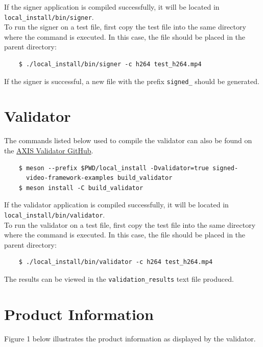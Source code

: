 \documentclass[a4paper,12pt]{article}
\begin{document}
If the signer application is compiled successfully, it will be located in \texttt{local\_install/bin/signer}. \\

To run the signer on a test file, first copy the test file into the same directory where the command is executed. In this case, the file should be placed in the parent directory:

\begin{verbatim}
    $ ./local_install/bin/signer -c h264 test_h264.mp4 
\end{verbatim}

If the signer is successful, a new file with the prefix \texttt{signed\_} should be generated.

\section{Validator}

The commands listed below used to compile the validator can also be found on the \href{https://github.com/AxisCommunications/signed-video-framework-examples/tree/master/apps/validator}{AXIS Validator GitHub}. 

\begin{verbatim}
    $ meson --prefix $PWD/local_install -Dvalidator=true signed-
      video-framework-examples build_validator
    $ meson install -C build_validator
\end{verbatim}

If the validator application is compiled successfully, it will be located in \texttt{local\_install/bin/validator}. \\

To run the validator on a test file, first copy the test file into the same directory where the command is executed. In this case, the file should be placed in the parent directory:

\begin{verbatim}
    $ ./local_install/bin/validator -c h264 test_h264.mp4 
\end{verbatim}

The results can be viewed in the \texttt{validation\_results} text file produced.

\section{Product Information}

Figure 1 below illustrates the product information as displayed by the validator.
\end{document}
